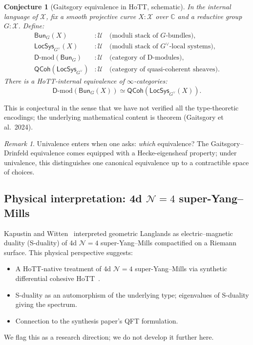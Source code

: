 \documentclass[12pt]{article}
\newtheorem{conjecture}[theorem]{Conjecture}
\theoremstyle{definition}
\theoremstyle{remark}
\newtheorem{remark}[theorem]{Remark}
\newcommand{\C}{\mathbb{C}}
\newcommand{\Type}{\mathcal{U}}
\begin{document}
\begin{conjecture}[Gaitsgory equivalence in HoTT, schematic]\label{conj:GLCHoTT}
In the internal language of $\mathcal{X}$, fix a smooth projective curve
$X:\mathcal{X}$ over $\C$ and a reductive group $G:\mathcal{X}$. Define:
\begin{align*}
\mathsf{Bun}_G(X) &:\Type \quad \text{(moduli stack of $G$-bundles)}, \\
\mathsf{LocSys}_{G^\vee}(X) &:\Type \quad \text{(moduli stack of $G^\vee$-local systems)}, \\
\mathsf{D}\text{-mod}(\mathsf{Bun}_G) &:\Type \quad \text{(category of D-modules)}, \\
\mathsf{QCoh}(\mathsf{LocSys}_{G^\vee}) &:\Type \quad \text{(category of quasi-coherent sheaves)}.
\end{align*}
There is a HoTT-internal equivalence of $\infty$-categories:
\[
\mathsf{D}\text{-mod}(\mathsf{Bun}_G(X)) \simeq \mathsf{QCoh}(\mathsf{LocSys}_{G^\vee}(X)).
\]
\end{conjecture}

This is conjectural in the sense that we have not verified all the
type-theoretic encodings; the underlying mathematical content is theorem
(Gaitsgory et al.\ 2024).

\begin{remark}\label{rem:univalence-glc}
Univalence enters when one asks: \emph{which} equivalence? The
Gaitsgory--Drinfeld equivalence comes equipped with a Hecke-eigensheaf
property; under univalence, this distinguishes one canonical equivalence up
to a contractible space of choices.
\end{remark}

\subsection{Physical interpretation: 4d \texorpdfstring{$\mathcal{N}=4$}{N=4} super-Yang--Mills}

Kapustin and Witten~\cite{KapustinWitten2007} interpreted geometric
Langlands as electric--magnetic duality (S-duality) of 4d
$\mathcal{N}=4$ super-Yang--Mills compactified on a Riemann surface.
This physical perspective suggests:
\begin{itemize}
\item A HoTT-native treatment of 4d $\mathcal{N}=4$ super-Yang--Mills via
synthetic differential cohesive HoTT~\cite{Schreiber2013}.
\item S-duality as an automorphism of the underlying type; eigenvalues of
S-duality giving the spectrum.
\item Connection to the synthesis paper's QFT formulation.
\end{itemize}
We flag this as a research direction; we do not develop it further here.
\end{document}
